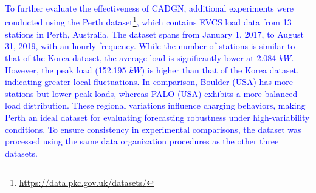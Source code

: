 \documentclass[lettersize,journal]{IEEEtran}
\newcommand{\hl}[1]{\textcolor{blue}{#1}}
\begin{document}
\begin{table}[htbp]
	\centering
	\caption{\hl{Performance comparison on Perth dataset.}}
		\vspace{-10pt}
	\label{tab:additional_Exp}%
\end{table}%


\hl{To further evaluate the effectiveness of CADGN, additional experiments were conducted using the Perth dataset\footnote{\url{https://data.pkc.gov.uk/datasets/}}, which contains EVCS load data from 13 stations in Perth, Australia. The dataset spans from January 1, 2017, to August 31, 2019, with an hourly frequency. While the number of stations is similar to that of the Korea dataset, the average load is significantly lower at 2.084 $kW$. However, the peak load (152.195 $kW$) is higher than that of the Korea dataset, indicating greater local fluctuations. In comparison, Boulder (USA) has more stations but lower peak loads, whereas PALO (USA) exhibits a more balanced load distribution. These regional variations influence charging behaviors, making Perth an ideal dataset for evaluating forecasting robustness under high-variability conditions. To ensure consistency in experimental comparisons, the dataset was processed using the same data organization procedures as the other three datasets.}
\end{document}
